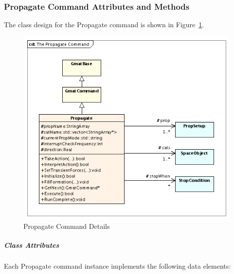 \subsubsection{Propagate Command Attributes and Methods}

The class design for the Propagate command is shown in Figure~\ref{figure:PropagateCommand}.

\begin{figure}[htb]
\begin{center}
\includegraphics[265,238]{Images/ThePropagateCommand.png}
\caption{\label{figure:PropagateCommand}Propagate Command Details}
\end{center}
\end{figure}

\subparagraph{\textit{Class Attributes}}

Each Propagate command instance implements the following data elements:


